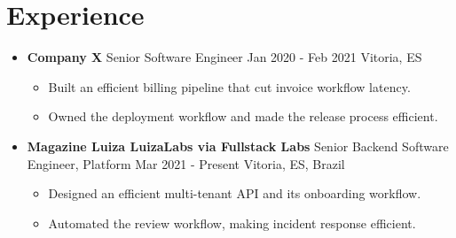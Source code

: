 \documentclass[letterpaper,10pt]{article}
\newcommand{\resumeItem}[1]{\item\small{#1}}
\newcommand{\resumeSubHeadingList}{\begin{itemize}[leftmargin=0.15in, label={}]}
\newcommand{\resumeSubHeadingListEnd}{\end{itemize}}
\newcommand{\resumeSubheading}[4]{
\vspace{-1pt}\item
  \textbf{#1} \textbar{} #3 \textbar{} #2 \textbar{} #4
  \vspace{-7pt}
}
\begin{document}
\section{Experience}
\resumeSubHeadingList
  \resumeSubheading
      {Company X}{Jan 2020 - Feb 2021}
      {Senior Software Engineer}{Vitoria, ES}
      \resumeSubHeadingList
          \resumeItem{Built an efficient billing pipeline that cut invoice workflow latency.}
          \resumeItem{Owned the deployment workflow and made the release process efficient.}
      \resumeSubHeadingListEnd
  \resumeSubheading
      {Magazine Luiza LuizaLabs via Fullstack Labs}{Mar 2021 - Present}
      {Senior Backend Software Engineer, Platform}{Vitoria, ES, Brazil}
      \resumeSubHeadingList
          \resumeItem{Designed an efficient multi-tenant API and its onboarding workflow.}
          \resumeItem{Automated the review workflow, making incident response efficient.}
      \resumeSubHeadingListEnd
\resumeSubHeadingListEnd
\end{document}
